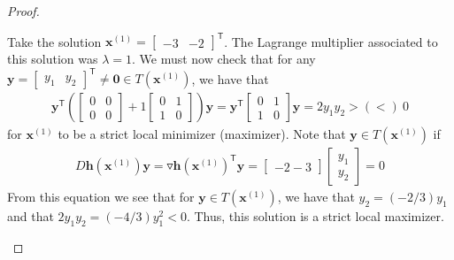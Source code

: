 \documentclass[12pt]{article}
\theoremstyle{definition}
\newcommand{\vc}[1]{\boldsymbol{#1}}
\newcommand{\tran}{\mathsf{T}}
\begin{document}
\begin{proof}
\begin{enumerate}
      Take the solution $\vc{x}^{(1)} = \begin{bmatrix}-3 & -2\end{bmatrix}^\tran$.
      The Lagrange multiplier associated to this solution was $\lambda=1$. We must
      now check that for any $\vc{y} = \begin{bmatrix}y_1 & y_2\end{bmatrix}^\tran \neq \vc{0} \in T(\vc{x}^{(1)})$, we have that
      \begin{align*}
        \vc{y}^\tran \left(\begin{bmatrix}0 & 0 \\ 0 & 0\end{bmatrix} + 1 \begin{bmatrix}0 & 1 \\ 1 & 0\end{bmatrix}\right) \vc{y} =
         \vc{y}^\tran \begin{bmatrix}0 & 1 \\ 1 & 0\end{bmatrix} \vc{y} = 2y_1 y_2 > (<)\ 0
      \end{align*}
      for $\vc{x}^{(1)}$ to be a strict local minimizer (maximizer).
      Note that $\vc{y}\in T(\vc{x}^{(1)})$ if
      \begin{align*}
        D \vc{h}(\vc{x}^{(1)})\vc{y} = \triangledown \vc{h}(\vc{x}^{(1)})^\tran \vc{y} = \begin{bmatrix}-2 -3\end{bmatrix}\begin{bmatrix}y_1 \\ y_2\end{bmatrix} = 0
      \end{align*}
      From this equation we see that for $\vc{y}\in T(\vc{x}^{(1)})$, we have that $y_2 = (-2/3 )y_1$ and that $2y_1 y_2 = (-4/3)y_1^2< 0$.
      Thus, this solution is a strict local maximizer.


\end{enumerate}
\end{proof}
\end{document}
